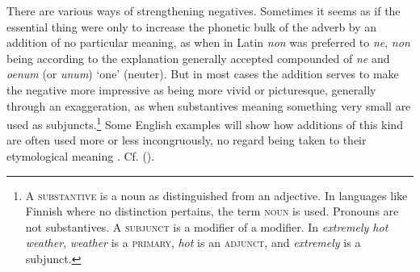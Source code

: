 \label{ch:2}

\label{para:non}There are various ways of strengthening negatives. Sometimes it seems as if the essential thing were only to increase the phonetic bulk of the adverb by an addition of no particular meaning, as when in Latin \textit{non} was preferred to \textit{ne}, \textit{non} being according to the explanation generally accepted compounded of \textit{ne} and \textit{oenum} (or %
\textit{unum}) `one' (neuter). %
But in most cases the addition serves to make the negative more impressive as being more vivid or picturesque, generally through an exaggeration, as when substantives meaning something very small are used as subjuncts.\footnote{A \textsc{substantive} is a noun as distinguished from an adjective. In languages like Finnish where no distinction pertains, the term \textsc{noun} is used. Pronouns are not substantives. A \textsc{subjunct} is a modifier of a modifier. In \textit{extremely hot weather}, \textit{weather} is a \textsc{primary}, \textit{hot} is an \textsc{adjunct}, and \textit{extremely} is a subjunct. \eds} Some English examples will show how additions of this kind are often used more or less incongruously, no regard being taken to their etymological meaning . Cf. ().

